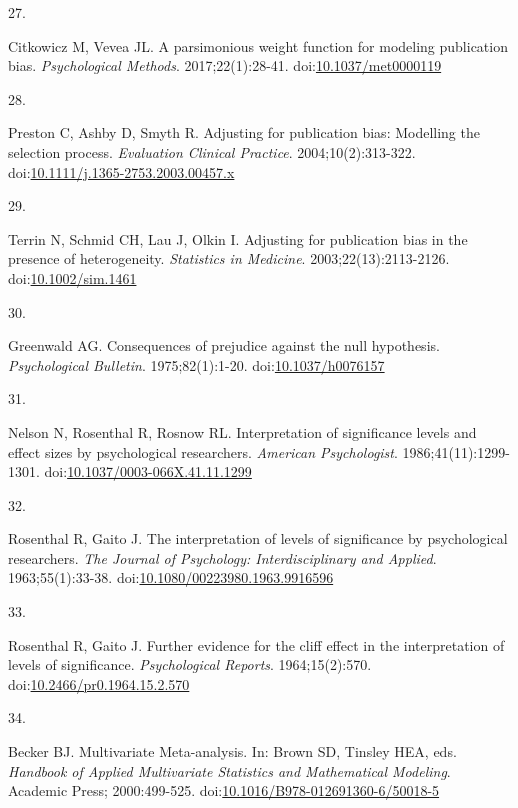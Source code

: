 \documentclass[
  american,
  man, donotrepeattitle,floatsintext]{apa7}
\newlength{\cslhangindent}
\newlength{\csllabelwidth}
\newenvironment{CSLReferences}[2] %
 {\begin{list}{}{%
  \setlength{\itemindent}{0pt}
  \setlength{\leftmargin}{0pt}
  \setlength{\parsep}{0pt}
  \ifodd #1
   \setlength{\leftmargin}{\cslhangindent}
   \setlength{\itemindent}{-1\cslhangindent}
  \fi
  \setlength{\itemsep}{#2\baselineskip}}}
 {\end{list}}
\newcommand{\CSLLeftMargin}[1]{\parbox[t]{\csllabelwidth}{\strut#1\strut}}
\newcommand{\CSLRightInline}[1]{\parbox[t]{\linewidth - \csllabelwidth}{\strut#1\strut}}
\begin{document}
\begin{CSLReferences}{0}{1}
\CSLLeftMargin{27. }%
\CSLRightInline{Citkowicz M, Vevea JL. {A parsimonious weight function for modeling publication bias}. \emph{Psychological Methods}. 2017;22(1):28-41. doi:\href{https://doi.org/10.1037/met0000119}{10.1037/met0000119}}

\CSLLeftMargin{28. }%
\CSLRightInline{Preston C, Ashby D, Smyth R. Adjusting for publication bias: Modelling the selection process. \emph{Evaluation Clinical Practice}. 2004;10(2):313-322. doi:\href{https://doi.org/10.1111/j.1365-2753.2003.00457.x}{10.1111/j.1365-2753.2003.00457.x}}

\CSLLeftMargin{29. }%
\CSLRightInline{Terrin N, Schmid CH, Lau J, Olkin I. Adjusting for publication bias in the presence of heterogeneity. \emph{Statistics in Medicine}. 2003;22(13):2113-2126. doi:\href{https://doi.org/10.1002/sim.1461}{10.1002/sim.1461}}

\CSLLeftMargin{30. }%
\CSLRightInline{Greenwald AG. Consequences of prejudice against the null hypothesis. \emph{Psychological Bulletin}. 1975;82(1):1-20. doi:\href{https://doi.org/10.1037/h0076157}{10.1037/h0076157}}

\CSLLeftMargin{31. }%
\CSLRightInline{Nelson N, Rosenthal R, Rosnow RL. Interpretation of significance levels and effect sizes by psychological researchers. \emph{American Psychologist}. 1986;41(11):1299-1301. doi:\href{https://doi.org/10.1037/0003-066X.41.11.1299}{10.1037/0003-066X.41.11.1299}}

\CSLLeftMargin{32. }%
\CSLRightInline{Rosenthal R, Gaito J. The interpretation of levels of significance by psychological researchers. \emph{The Journal of Psychology: Interdisciplinary and Applied}. 1963;55(1):33-38. doi:\href{https://doi.org/10.1080/00223980.1963.9916596}{10.1080/00223980.1963.9916596}}

\CSLLeftMargin{33. }%
\CSLRightInline{Rosenthal R, Gaito J. Further evidence for the cliff effect in the interpretation of levels of significance. \emph{Psychological Reports}. 1964;15(2):570. doi:\href{https://doi.org/10.2466/pr0.1964.15.2.570}{10.2466/pr0.1964.15.2.570}}

\CSLLeftMargin{34. }%
\CSLRightInline{Becker BJ. {Multivariate Meta-analysis}. In: Brown SD, Tinsley HEA, eds. \emph{Handbook of Applied Multivariate Statistics and Mathematical Modeling}. Academic Press; 2000:499-525. doi:\href{https://doi.org/10.1016/B978-012691360-6/50018-5}{10.1016/B978-012691360-6/50018-5}}


\end{CSLReferences}
\end{document}
